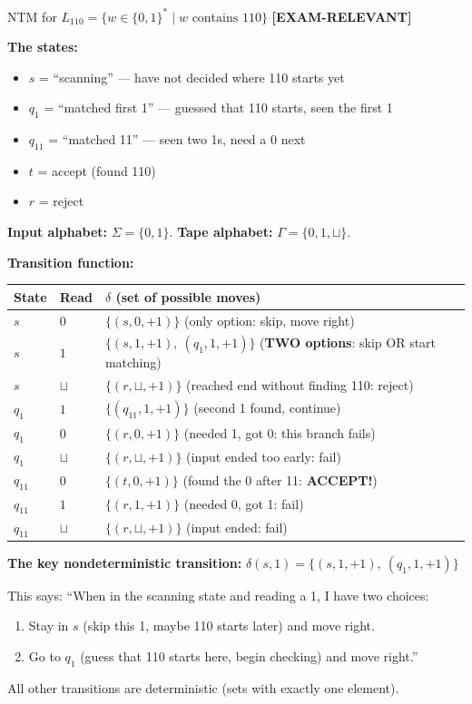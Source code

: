 \documentclass[11pt,a4paper]{article}
\newcommand{\kemark}{\textcolor{red!70!black}{\textbf{[EXAM-RELEVANT]}}}
\begin{document}
\begin{definitionbox}{{NTM for $L_{110} = \{w \in \{0,1\}^* \mid w \text{ contains } 110\}$} \kemark}

\textbf{The states:}
\begin{itemize}[nosep]
\item $s$ = ``scanning'' --- have not decided where 110 starts yet
\item $q_1$ = ``matched first 1'' --- guessed that 110 starts, seen the first 1
\item $q_{11}$ = ``matched 11'' --- seen two 1s, need a 0 next
\item $t$ = accept (found 110)
\item $r$ = reject
\end{itemize}

\textbf{Input alphabet:} $\Sigma = \{0, 1\}$. \textbf{Tape alphabet:} $\Gamma = \{0, 1, \sqcup\}$.

\textbf{Transition function:}

\begin{center}
\begin{tabular}{lll}
\toprule
State & Read & $\delta$ (set of possible moves) \\
\midrule
$s$ & $0$ & $\{(s, 0, +1)\}$ \quad (only option: skip, move right) \\
$s$ & $1$ & $\{(s, 1, +1),\ (q_1, 1, +1)\}$ \quad (\textbf{TWO options}: skip OR start matching) \\
$s$ & $\sqcup$ & $\{(r, \sqcup, +1)\}$ \quad (reached end without finding 110: reject) \\
$q_1$ & $1$ & $\{(q_{11}, 1, +1)\}$ \quad (second 1 found, continue) \\
$q_1$ & $0$ & $\{(r, 0, +1)\}$ \quad (needed 1, got 0: this branch fails) \\
$q_1$ & $\sqcup$ & $\{(r, \sqcup, +1)\}$ \quad (input ended too early: fail) \\
$q_{11}$ & $0$ & $\{(t, 0, +1)\}$ \quad (found the 0 after 11: \textbf{ACCEPT!}) \\
$q_{11}$ & $1$ & $\{(r, 1, +1)\}$ \quad (needed 0, got 1: fail) \\
$q_{11}$ & $\sqcup$ & $\{(r, \sqcup, +1)\}$ \quad (input ended: fail) \\
\bottomrule
\end{tabular}
\end{center}

\textbf{The key nondeterministic transition:} $\delta(s, 1) = \{(s, 1, +1),\ (q_1, 1, +1)\}$

This says: ``When in the scanning state and reading a 1, I have two choices:
\begin{enumerate}[nosep]
\item Stay in $s$ (skip this 1, maybe 110 starts later) and move right.
\item Go to $q_1$ (guess that 110 starts here, begin checking) and move right.''
\end{enumerate}

All other transitions are deterministic (sets with exactly one element).
\end{definitionbox}
\end{document}
